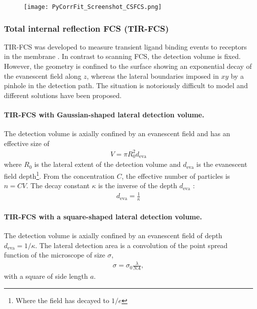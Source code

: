 \begin{figure}[h]
\centering
\texttt{[image: PyCorrFit\_Screenshot\_CSFCS.png]}
\end{figure}

\vspace{1em}
\subsubsection{Total internal reflection FCS (TIR-FCS)}
\label{sec:theor.exten.total}
TIR-FCS was developed to measure transient ligand binding events to receptors in the membrane \cite{Thompson2007}. In contrast to scanning FCS, the detection volume is fixed. However, the geometry is confined to the surface showing an exponential decay of the evanescent field along $z$, whereas the lateral boundaries imposed in $xy$ by a pinhole in the detection path. The situation is notoriously difficult to model and different solutions have been proposed.

\paragraph{TIR-FCS with Gaussian-shaped lateral detection volume.}
The detection volume is axially confined by an evanescent field and has an effective size of
\begin{align}
V = \pi R_0^2 d_\mathrm{eva}
\end{align} 
where $R_0$ is the lateral extent of the detection volume and $d_\mathrm{eva}$ is the evanescent field depth\footnote{Where the field has decayed to $1/e$}. From the concentration $C$, the effective number of particles is $n = CV$.
The decay constant $\kappa$ is the inverse of the depth $d_\mathrm{eva}$ :
\begin{align}
d_\mathrm{eva} = \frac{1}{\kappa}
\end{align} 

\paragraph{TIR-FCS with a square-shaped lateral detection volume.}
The detection volume is axially confined by an evanescent field of depth $d_\mathrm{eva} = 1 / \kappa$.
The lateral detection area is a convolution of the point spread function of the microscope of size $\sigma$,
\begin{align}
\sigma = \sigma_0  \frac{\lambda}{\mathit{NA}},
\end{align} 
with a square of side length $a$.


